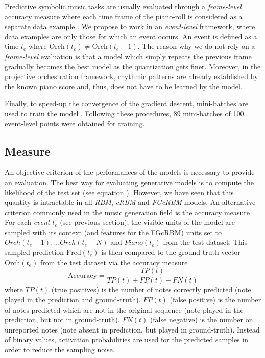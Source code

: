 \documentclass[letterpaper]{article}
\begin{document}
Predictive symbolic music tasks are usually evaluated through a \textit{frame-level} accuracy measure where each time frame of the piano-roll is considered as a separate data example \cite{DBLP:journals/corr/YaoCVDD15,boulanger2012modeling,lavrenko2003polyphonic}.
We propose to work in an \textit{event-level} framework, where data examples are only those for which an event occurs. An event is defined as a time $t_{e}$ where $\text{Orch}(t_{e}) \neq \text{Orch}(t_{e} - 1)$. The reason why we do not rely on a \textit{frame-level} evaluation is that a model which simply repeats the previous frame gradually becomes the best model as the quantization gets finer. Moreover, in the projective orchestration framework, rhythmic patterns are already established by the known piano score and, thus, does not have to be learned by the model.

Finally, to speed-up the convergence of the gradient descent, mini-batches are used to train the model \cite{bishop2006pattern}. Following these procedures, 89 mini-batches of 100 event-level points were obtained for training.

\subsection{Measure}
An objective criterion of the performances of the models is necessary to provide an evaluation. 
The best way for evaluating generative models is to compute the likelihood of the test set (see equation ). However, we have seen that this quantity is intractable in all \textit{RBM}, \textit{cRBM} and \textit{FGcRBM} models. 
An alternative criterion commonly used in the music generation field is the accuracy measure \cite{DBLP:journals/corr/YaoCVDD15,boulanger2012modeling,lavrenko2003polyphonic}. For each \textit{event} $t_{e}$ (see previous section), the visible units of the model are sampled with its context (and features for the FGcRBM) units set to $Orch(t_{e}-1),... Orch(t_{e}-N)$ and $Piano(t_{e})$ from the test dataset. This sampled prediction $\text{Pred}(t_{e})$ is then compared to the ground-truth vector $\text{Orch}(t_{e})$ from the test dataset via the accuracy measure
\begin{equation}
\text{Accuracy}  = \frac{TP(t)}{TP(t) + FP(t) + FN(t)}
\label{eq:accuracy}
\end{equation}
where $TP(t)$ (true positives) is the number of notes correctly predicted (note played in the prediction and ground-truth). $FP(t)$ (false positive) is the number of notes predicted which are not in the original sequence (note played in the prediction, but not in ground-truth). $FN(t)$ (false negative) is the number on unreported notes (note absent in prediction, but played in ground-truth). 
Instead of binary values, activation probabilities are used for the predicted samples in order to reduce the sampling noise.
\end{document}
